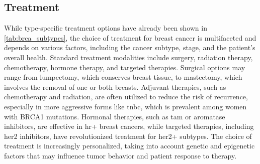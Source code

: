 \subsection{Treatment}
\label{sec:brca_treatment}

While type-specific treatment options have already been shown in
\cref{tab:brca_subtypes}, the choice of treatment for breast cancer is
multifaceted and depends on various factors, including the cancer subtype,
stage, and the patient's overall health.
Standard treatment modalities include surgery, radiation therapy, chemotherapy,
hormone therapy, and targeted therapies.
Surgical options may range from lumpectomy, which conserves breast tissue, to
mastectomy, which involves the removal of one or both
breasts\supercite{metcalfe_contralateral_2014,wu_breast_2014}.
Adjuvant therapies, such as chemotherapy and radiation, are often utilized to
reduce the risk of recurrence, especially in more aggressive forms like
\gls{tnbc}, which is prevalent among women with BRCA1
mutations\supercite{metcalfe_contralateral_2014}.
Hormonal therapies, such as \gls{tam} or aromatase inhibitors, are effective in
\gls{hr+} breast cancers, while targeted therapies, including \gls{her2}
inhibitors, have revolutionized treatment for \gls{her2+}
subtypes\supercite{eccles_critical_2013,pace_breast_2016}.
The choice of treatment is increasingly personalized, taking into account
genetic and epigenetic factors that may influence tumor behavior and patient
response to therapy\supercite{khakpour_methylomics_2017}.
